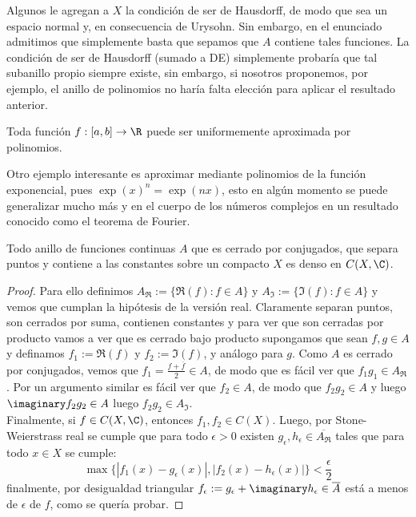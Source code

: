 \documentclass[topologia-analisis.tex]{subfiles}
\begin{document}
Algunos le agregan a $X$ la condición de ser de Hausdorff, de modo que sea un espacio normal y, en consecuencia de Urysohn. Sin embargo, en el enunciado admitimos que simplemente basta que sepamos que $A$ contiene tales funciones.
La condición de ser de Hausdorff (sumado a DE) simplemente probaría que tal subanillo propio siempre existe, sin embargo, si nosotros proponemos, por ejemplo, el anillo de polinomios no haría falta elección para aplicar el resultado anterior.

\begin{cor}
	Toda función $f: [a,b] \to \R$ puede ser uniformemente aproximada por polinomios.
\end{cor}
Otro ejemplo interesante es aproximar mediante polinomios de la función exponencial, pues $\exp(x)^n = \exp(nx)$, esto en algún momento se puede generalizar mucho más y en el cuerpo de los números complejos en un resultado conocido como el teorema de Fourier.

\begin{thmi}
	Todo anillo de funciones continuas $A$ que es cerrado por conjugados, que separa puntos y contiene a las constantes sobre un compacto $X$ es denso en $C(X,\C)$.
\end{thmi}
\begin{proof}
	Para ello definimos $A_{\Re} := \{\Re(f) : f\in A\}$ y $A_{\Im} := \{\Im(f) : f\in A\}$ y vemos que cumplan la hipótesis de la versión real.
	Claramente separan puntos, son cerrados por suma, contienen constantes y para ver que son cerradas por producto vamos a ver que es cerrado bajo producto supongamos que sean $f,g\in A$ y definamos $f_1 := \Re(f)$ y $f_2 := \Im(f)$, y análogo para $g$.
	Como $A$ es cerrado por conjugados, vemos que $f_1 = \frac{f + \overline f}{2} \in A$, de modo que es fácil ver que $f_1g_1 \in A_{\Re}$.
	Por un argumento similar es fácil ver que $f_2\in A$, de modo que $f_2g_2\in A$ y luego $\imaginary f_2g_2\in A$ luego $f_2g_2\in A_{\Im}$.
	\\
	Finalmente, si $f\in C(X,\C)$, entonces $f_1,f_2\in C(X)$.
	Luego, por Stone-Weierstrass real se cumple que para todo $\epsilon > 0$ existen $g_\epsilon,h_\epsilon\in\overline{A_{\Re}}$ tales que para todo $x\in X$ se cumple:
	$$ \max\{ |f_1(x) - g_\epsilon(x)|, |f_2(x) - h_\epsilon(x)| \} < \frac{\epsilon}{2} $$
	finalmente, por desigualdad triangular $f_\epsilon := g_\epsilon + \imaginary h_\epsilon\in \overline A$ está a menos de $\epsilon$ de $f$, como se quería probar.
\end{proof}
\end{document}
